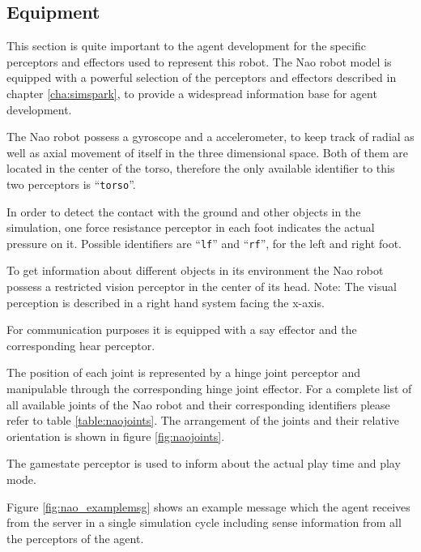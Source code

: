\subsection{Equipment}
This section is quite important to the agent development for the specific
perceptors and effectors used to represent this robot.
The Nao robot model is equipped with a powerful selection of the perceptors and
effectors described in chapter \ref{cha:simspark}, to provide a widespread
information base for agent development.

The Nao robot possess a gyroscope and a accelerometer, to keep track of radial
as well as axial movement of itself in the three dimensional space.
Both of them are located in the center of the torso, therefore the only
available identifier to this two perceptors is ``\texttt{torso}''.
  
In order to detect the contact with the ground and other objects in the
simulation, one force resistance perceptor in each foot indicates the actual
pressure on it. Possible identifiers are ``\texttt{lf}'' and ``\texttt{rf}'',
for the left and right foot.

To get information about different objects in its environment the Nao robot
possess a restricted vision perceptor in the center of its head.
Note: The visual perception is described in a right hand system facing the
x-axis.

For communication purposes it is equipped with a say effector and the
corresponding hear perceptor.

The position of each joint is represented by a hinge joint perceptor and
manipulable through the corresponding hinge joint effector. For a complete
list of all available joints of the Nao robot and their corresponding
identifiers please refer to table \ref{table:naojoints}. The arrangement of the
joints and their relative orientation is shown in figure \ref{fig:naojoints}.

The gamestate perceptor is used to inform about the actual play time and play
mode.

Figure \ref{fig:nao_examplemsg} shows an example message which the agent
receives from the server in a single simulation cycle including sense
information from all the perceptors of the agent.

